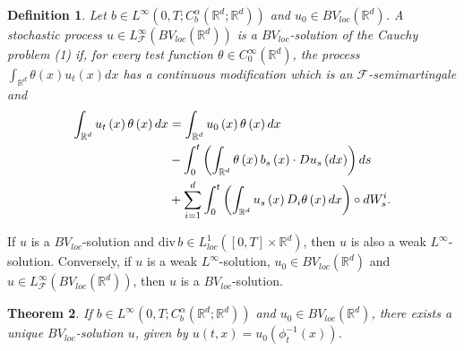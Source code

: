 \documentclass[a4paper,11pt]{article}
\newtheorem{theorem}{Theorem}
\newtheorem{definition}[theorem]{Definition}
\begin{document}
\begin{definition}
Let $b\in L^{\infty }\left( 0,T;C_{b}^{\alpha }({\mathbb{R}}^{d};{\mathbb{R}}%
^{d})\right) $ and $u_{0}\in BV_{loc}\left( \mathbb{R}^{d}\right) $. A
stochastic process $u\in L_{\mathcal{F}}^{\infty }\left( BV_{loc}\left(
\mathbb{R}^{d}\right) \right) $ is a $BV_{loc}$-solution of the Cauchy
problem (1) if, for every test function $\theta \in C_{0}^{\infty }\left(
\mathbb{R}^{d}\right) $, the process $\int_{\mathbb{R}^{d}}\theta \left(
x\right) u_{t}\left( x\right) dx$ has a continuous modification which is an $%
\mathcal{F}$-semimartin\-gale and
\begin{align*}
\int_{\mathbb{R}^{d}}u_{t}\left( x\right) \theta \left( x\right) dx& =\int_{%
\mathbb{R}^{d}}u_{0}\left( x\right) \theta \left( x\right) dx \\
& -\int_{0}^{t}\left( \int_{\mathbb{R}^{d}}\theta \left( x\right)
b_{s}\left( x\right) \cdot Du_{s}\left( dx\right) \right) ds \\
& +\sum_{i=1}^{d}\int_{0}^{t}\left( \int_{\mathbb{R}^{d}}u_{s}\left(
x\right) D_{i}\theta \left( x\right) dx\right) \circ dW_{s}^{i}.
\end{align*}
\end{definition}

If $u$ is a $BV_{loc}$-solution and $\mathrm{div}\,b\in L_{loc}^{1}\left( %
\left[ 0,T\right] \times\mathbb{R}^{d}\right) $, then $u$ is also a weak $%
L^{\infty}$-solution. Conversely, if $u$ is a weak $L^{\infty}$-solution, $%
u_{0}\in BV_{loc}\left( \mathbb{R}^{d}\right) $ and $u\in L_{\mathcal{F}%
}^{\infty}\left( BV_{loc}\left( \mathbb{R}^{d}\right) \right) $, then $u$ is
a $BV_{loc}$-solution.

\begin{theorem}
If $b\in L^{\infty }\left( 0,T;C_{b}^{\alpha }({\mathbb{R}}^{d};{\mathbb{R}}%
^{d})\right) $ and $u_{0}\in BV_{loc}\left( \mathbb{R}^{d}\right) $, there
exists a unique $BV_{loc}$-solution $u$, given by $u\left( t,x\right)
=u_{0}\left( \phi _{t}^{-1}\left( x\right) \right) $.
\end{theorem}
\end{document}

